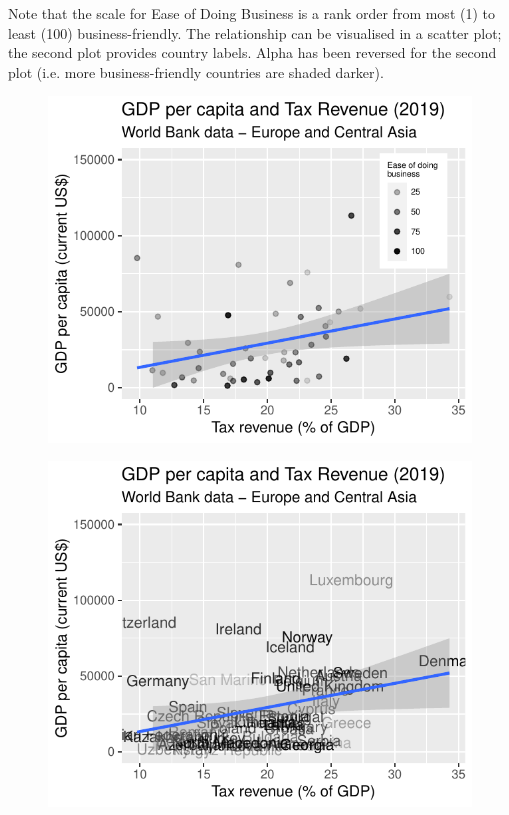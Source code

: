 \documentclass[]{report}
\begin{document}
Note that the scale for Ease of Doing Business is a rank order from most (1) to least (100) business-friendly. The relationship can be visualised in a scatter plot; the second plot provides country labels. Alpha has been reversed for the second plot (i.e. more business-friendly countries are shaded darker).

\begin{figure}[b!]\centering
	\includegraphics[width=.7\textwidth]{GDPpc.pdf}\\
\end{figure}

\begin{figure}[b!]\centering
	\includegraphics[width=.7\textwidth]{GDPpc_co_lab.pdf}\\
\end{figure}
\end{document}
